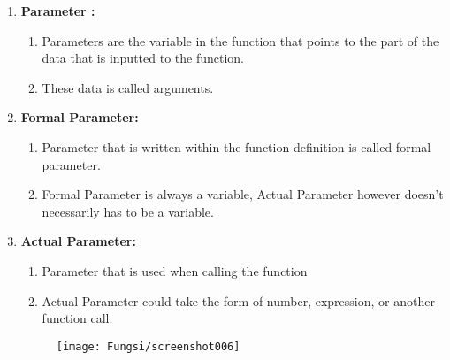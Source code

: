 \begin{enumerate}
	\item  \textbf{Parameter :}
\begin{enumerate}
    \item Parameters are the variable in the function that points to the part of the data that is inputted to the function.
    \item These data is called arguments.
	
\end{enumerate}

\item \textbf{Formal Parameter:}
\begin{enumerate}
    \item Parameter that is written within the function definition is called formal parameter.
    \item Formal Parameter is always a variable, Actual Parameter however doesn't necessarily has to be a variable.
	
\end{enumerate}


\item \textbf{Actual Parameter:}
\begin{enumerate}
    \item Parameter that is used when calling the function
    \item Actual Parameter could take the form of number, expression, or another function call.
\end{enumerate}
\begin{figure}[H]
	\centering
	\texttt{[image: Fungsi/screenshot006]}
	\caption{}
	\label{fig:parameterformalaktual}
\end{figure}
\end{enumerate}
